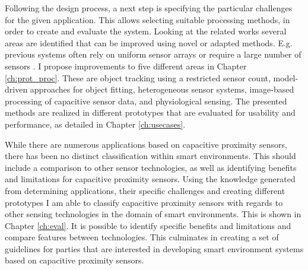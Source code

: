 Following the design process, a next step is specifying the particular challenges for the given application. This allows selecting suitable processing methods, in order to create and evaluate the system. Looking at the related works several areas are identified that can be improved using novel or adapted methods. E.g. previous systems often rely on uniform sensor arrays \cite{Smith1996a} or require a large number of sensors \cite{rekimoto2002smartskin}. I propose improvements to five different areas in Chapter \ref{ch:prot_proc}. These are object tracking using a restricted sensor count, model-driven approaches for object fitting, heterogeneous sensor systems, image-based processing of capacitive sensor data, and physiological sensing. The presented methods are realized in different prototypes that are evaluated for usability and performance, as detailed in Chapter \ref{ch:usecases}.

While there are numerous applications based on capacitive proximity sensors, there has been no distinct classification within smart environments. This should include a comparison to other sensor technologies, as well as identifying benefits and limitations for capacitive proximity sensors. Using the knowledge generated from determining applications, their specific challenges and creating different prototypes I am able to classify capacitive proximity sensors with regards to other sensing technologies in the domain of smart environments. This is shown in Chapter \ref{ch:eval}. It is possible to identify specific benefits and limitations and compare features between technologies. This culminates in creating a set of guidelines for parties that are interested in developing smart environment systems based on capacitive proximity sensors.
 
